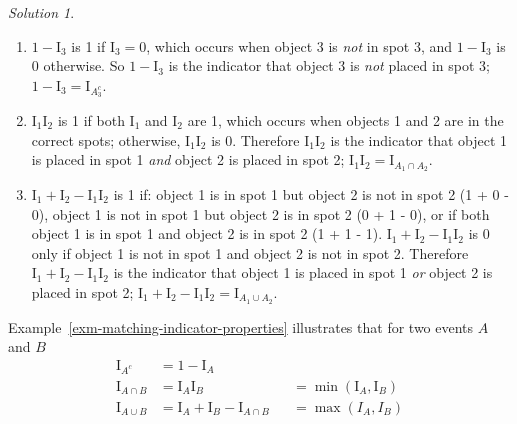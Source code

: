 \documentclass[
  letterpaper,
  DIV=11,
  numbers=noendperiod]{scrreprt}
\providecommand{\tightlist}{%
  \setlength{\itemsep}{0pt}\setlength{\parskip}{0pt}}
\theoremstyle{plain}
\theoremstyle{definition}
\theoremstyle{definition}
\theoremstyle{definition}
\theoremstyle{remark}
\newtheorem{refsolution}{Solution}[chapter]
\begin{document}
\begin{tcolorbox}[enhanced jigsaw, opacityback=0, rightrule=.15mm, coltitle=black, colframe=quarto-callout-tip-color-frame, toprule=.15mm, colbacktitle=quarto-callout-tip-color!10!white, opacitybacktitle=0.6, left=2mm, toptitle=1mm, breakable, title={Solution (click to expand)}, bottomtitle=1mm, colback=white, leftrule=.75mm, titlerule=0mm, arc=.35mm, bottomrule=.15mm]

\begin{refsolution}
\leavevmode

\begin{enumerate}
\def\labelenumi{\arabic{enumi}.}
\tightlist
\item
  \(1 - \textrm{I}_3\) is 1 if \(\textrm{I}_3 = 0\), which occurs when
  object 3 is \emph{not} in spot 3, and \(1 - \textrm{I}_3\) is 0
  otherwise. So \(1 - \textrm{I}_3\) is the indicator that object 3 is
  \emph{not} placed in spot 3; \(1-\textrm{I}_3 = \textrm{I}_{A_3^c}\).
\item
  \(\textrm{I}_1 \textrm{I}_2\) is 1 if both \(\textrm{I}_1\) and
  \(\textrm{I}_2\) are 1, which occurs when objects 1 and 2 are in the
  correct spots; otherwise, \(\textrm{I}_1 \textrm{I}_2\) is 0.
  Therefore \(\textrm{I}_1 \textrm{I}_2\) is the indicator that object 1
  is placed in spot 1 \emph{and} object 2 is placed in spot 2;
  \(\textrm{I}_1\textrm{I}_2 = \textrm{I}_{A_1 \cap A_2}\).
\item
  \(\textrm{I}_1 + \textrm{I}_2 - \textrm{I}_1 \textrm{I}_2\) is 1 if:
  object 1 is in spot 1 but object 2 is not in spot 2 (1 + 0 - 0),
  object 1 is not in spot 1 but object 2 is in spot 2 (0 + 1 - 0), or if
  both object 1 is in spot 1 and object 2 is in spot 2 (1 + 1 - 1).
  \(\textrm{I}_1 + \textrm{I}_2 - \textrm{I}_1 \textrm{I}_2\) is 0 only
  if object 1 is not in spot 1 and object 2 is not in spot 2. Therefore
  \(\textrm{I}_1 + \textrm{I}_2 - \textrm{I}_1 \textrm{I}_2\) is the
  indicator that object 1 is placed in spot 1 \emph{or} object 2 is
  placed in spot 2;
  \(\textrm{I}_1 + \textrm{I}_2 - \textrm{I}_1 \textrm{I}_2 = \textrm{I}_{A_1 \cup A_2}\).
\end{enumerate}

\label{sol-matching-indicator-properties}

\end{refsolution}

\end{tcolorbox}

Example~\ref{exm-matching-indicator-properties} illustrates that for two
events \(A\) and \(B\) \begin{align*}
\textrm{I}_{A^c} & = 1 - \textrm{I}_A & & \\
\textrm{I}_{A \cap B} & = \textrm{I}_A \textrm{I}_B & & =\min(\textrm{I}_A, \textrm{I}_B)\\
\textrm{I}_{A \cup B} & = \textrm{I}_A + \textrm{I}_B - \textrm{I}_{A \cap B} & & = \max(I_A, I_B)
\end{align*}
\end{document}
